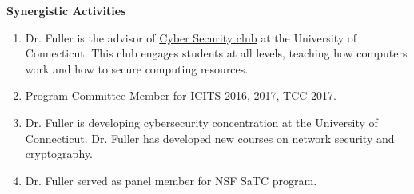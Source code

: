 \documentclass{article}
\begin{document}
\noindent
\textbf{Synergistic Activities}
\begin{enumerate}
\item Dr. Fuller is the advisor of \href{https://uconntact.uconn.edu/organization/UCSC}{Cyber Security club} at the University of Connecticut.  This club engages students at all levels, teaching how computers work and how to secure computing resources.

\item Program Committee Member for ICITS 2016, 2017, TCC 2017.
\item Dr. Fuller is developing cybersecurity concentration at the University of Connecticut.  Dr. Fuller has developed new courses on network security and cryptography.

\item Dr. Fuller served as panel member for NSF SaTC program.
\end{enumerate}
%
%
\end{document}
